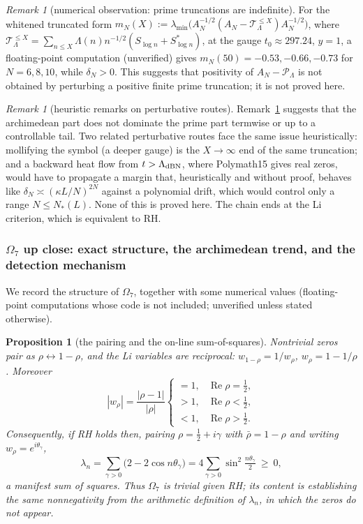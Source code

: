 \documentclass[11pt]{amsart}
\newtheorem{proposition}[theorem]{Proposition}
\theoremstyle{definition}
\theoremstyle{remark}
\newtheorem{remark}[theorem]{Remark}
\theoremstyle{definition}
\renewcommand{\Re}{\operatorname{Re}}
\begin{document}
\begin{remark}[numerical observation: prime truncations are indefinite]
\label{thm:no-truncation}
For the whitened truncated form
$m_N(X):=\lambda_{\min}\bigl(A_N^{-1/2}(A_N-\mathcal T_\Lambda^{\le X})A_N^{-1/2}\bigr)$, where
$\mathcal T_\Lambda^{\le X}=\sum_{n\le X}\Lambda(n)n^{-1/2}(S_{\log n}+S_{\log n}^*)$, at the gauge
$t_0\approx297.24$, $y=1$, a floating-point computation (unverified) gives $m_N(50)=-0.53,-0.66,-0.73$
for $N=6,8,10$, while $\delta_N>0$.  This suggests that positivity of $A_N-\mathcal P_\Lambda$ is not
obtained by perturbing a positive finite prime truncation; it is not proved here.
\end{remark}

\begin{remark}[heuristic remarks on perturbative routes]\label{rmk:omega-shape}
Remark~\ref{thm:no-truncation} suggests that the archimedean part does not dominate the prime part
termwise or up to a controllable tail.  Two related perturbative routes face the same issue
heuristically: mollifying the symbol (a deeper gauge) is the $X\to\infty$ end of the same truncation;
and a backward heat flow from $t>\Lambda_{\rm dBN}$, where Polymath15 \cite{PolymathDBN} gives real
zeros, would have to propagate a margin that, heuristically and without proof, behaves like
$\delta_N\asymp(\kappa L/N)^{2N}$ against a polynomial drift, which would control only a range
$N\le N_*(L)$.  None of this is proved here.
The chain ends at the Li criterion, which is equivalent to RH.
\end{remark}

\subsubsection*{$\Omega_7$ up close: exact structure, the archimedean trend, and the detection mechanism}

We record the structure of $\Omega_7$, together with some numerical values (floating-point
computations whose code is not included; unverified unless stated otherwise).

\begin{proposition}[the pairing and the on-line sum-of-squares]\label{prop:li-sos}
Nontrivial zeros pair as $\rho\leftrightarrow1-\rho$, and the Li variables are reciprocal:
$w_{1-\rho}=1/w_\rho$, $w_\rho=1-1/\rho$.  Moreover
\[
   |w_\rho|=\frac{|\rho-1|}{|\rho|}
   \begin{cases} =1,&\Re\rho=\tfrac12,\\ >1,&\Re\rho<\tfrac12,\\<1,&\Re\rho>\tfrac12.\end{cases}
\]
Consequently, if RH holds then, pairing $\rho=\tfrac12+i\gamma$ with $\bar\rho=1-\rho$ and writing
$w_\rho=e^{i\theta_\gamma}$,
\[
   \lambda_n=\sum_{\gamma>0}\bigl(2-2\cos n\theta_\gamma\bigr)
   =4\sum_{\gamma>0}\sin^2\!\tfrac{n\theta_\gamma}{2}\ \ge\ 0,
\]
a manifest sum of squares.  Thus $\Omega_7$ is trivial \emph{given} RH; its content is establishing the
same nonnegativity from the arithmetic definition of $\lambda_n$, in which the zeros do not appear.
\end{proposition}
\end{document}

